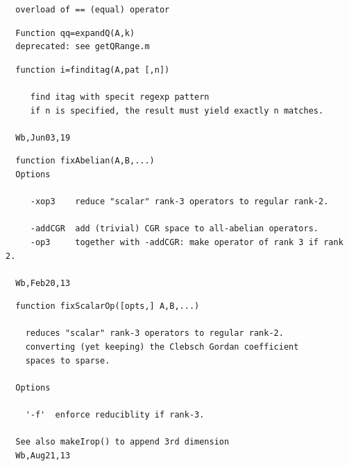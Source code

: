 \documentclass[twoside,12pt]{article}
\begin{document}
\pagebreak[3]



\begin{verbatim}
  overload of == (equal) operator
\end{verbatim}

\pagebreak[3]



\begin{verbatim}
  Function qq=expandQ(A,k)
  deprecated: see getQRange.m
\end{verbatim}

\pagebreak[3]



\begin{verbatim}
  function i=finditag(A,pat [,n])
 
     find itag with specit regexp pattern
     if n is specified, the result must yield exactly n matches.
 
  Wb,Jun03,19
\end{verbatim}

\pagebreak[3]



\begin{verbatim}
  function fixAbelian(A,B,...)
  Options
 
     -xop3    reduce "scalar" rank-3 operators to regular rank-2.
 
     -addCGR  add (trivial) CGR space to all-abelian operators.
     -op3     together with -addCGR: make operator of rank 3 if rank 2.
 
  Wb,Feb20,13
\end{verbatim}

\pagebreak[3]



\begin{verbatim}
  function fixScalarOp([opts,] A,B,...)
 
    reduces "scalar" rank-3 operators to regular rank-2.
    converting (yet keeping) the Clebsch Gordan coefficient
    spaces to sparse.
 
  Options
 
    '-f'  enforce reduciblity if rank-3.
 
  See also makeIrop() to append 3rd dimension
  Wb,Aug21,13
\end{verbatim}

\pagebreak[3]
\end{document}
